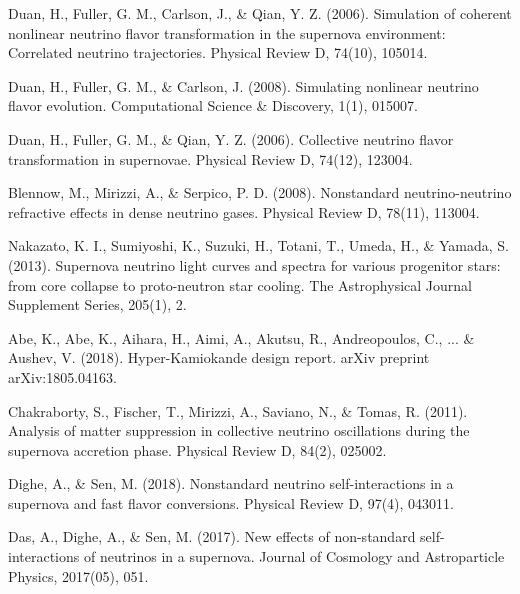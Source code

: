 \documentclass[11pt, oneside]{article}   	%
\begin{document}
\begin{thebibliography}{9}
Duan, H., Fuller, G. M., Carlson, J., \& Qian, Y. Z. (2006). Simulation of coherent nonlinear neutrino flavor transformation in the supernova environment: Correlated neutrino trajectories. Physical Review D, 74(10), 105014.

Duan, H., Fuller, G. M., \& Carlson, J. (2008). Simulating nonlinear neutrino flavor evolution. Computational Science \& Discovery, 1(1), 015007.

Duan, H., Fuller, G. M., \& Qian, Y. Z. (2006). Collective neutrino flavor transformation in supernovae. Physical Review D, 74(12), 123004.

Blennow, M., Mirizzi, A., \& Serpico, P. D. (2008). Nonstandard neutrino-neutrino refractive effects in dense neutrino gases. Physical Review D, 78(11), 113004.

Nakazato, K. I., Sumiyoshi, K., Suzuki, H., Totani, T., Umeda, H., \& Yamada, S. (2013). Supernova neutrino light curves and spectra for various progenitor stars: from core collapse to proto-neutron star cooling. The Astrophysical Journal Supplement Series, 205(1), 2.

Abe, K., Abe, K., Aihara, H., Aimi, A., Akutsu, R., Andreopoulos, C., ... \& Aushev, V. (2018). Hyper-Kamiokande design report. arXiv preprint arXiv:1805.04163.

Chakraborty, S., Fischer, T., Mirizzi, A., Saviano, N., \& Tomas, R. (2011). Analysis of matter suppression in collective neutrino oscillations during the supernova accretion phase. Physical Review D, 84(2), 025002.

Dighe, A., \& Sen, M. (2018). Nonstandard neutrino self-interactions in a supernova and fast flavor conversions. Physical Review D, 97(4), 043011.

Das, A., Dighe, A., \& Sen, M. (2017). New effects of non-standard self-interactions of neutrinos in a supernova. Journal of Cosmology and Astroparticle Physics, 2017(05), 051.

\end{thebibliography}
\end{document}
